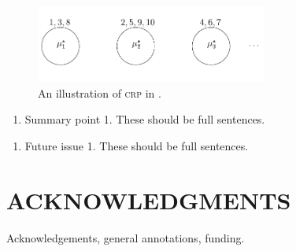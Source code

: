 \documentclass{ar-1col}
\begin{document}
\begin{figure}
    \includegraphics[width=3in, height=1in]{images/chinese_restaurant.pdf}
    \caption{An illustration of \textsc{crp} in \citet{Blei2007}.}
    \label{fig:crp}
\end{figure}

\begin{summary}
\begin{enumerate}
\item Summary point 1. These should be full sentences.
\end{enumerate}
\end{summary}

\begin{issues}
\begin{enumerate}
\item Future issue 1. These should be full sentences.
\end{enumerate}
\end{issues}

 
\section*{ACKNOWLEDGMENTS}
Acknowledgements, general annotations, funding.






\end{document}
